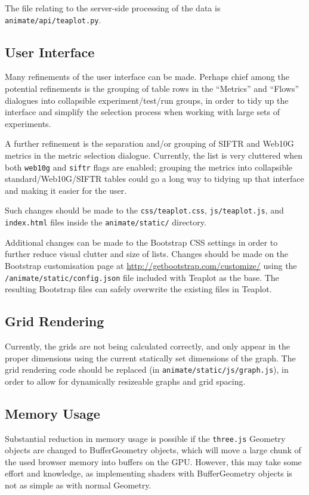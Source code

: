 \documentclass[a4paper,twocolumn,english,11pt, a4paper, conference]{IEEEtran}
\begin{document}
The file relating to the server-side processing of the data is \texttt{animate/api/teaplot.py}.

\subsection{User Interface}
Many refinements of the user interface can be made. Perhaps chief among the potential refinements is the grouping of table rows in the ``Metrics'' and ``Flows'' dialogues into collapsible experiment/test/run groups, in order to tidy up the interface and simplify the selection process when working with large sets of experiments. 

A further refinement is the separation and/or grouping of SIFTR \cite{siftr} and Web10G \cite{web10g} metrics in the metric selection dialogue. Currently, the list is very cluttered when both \texttt{web10g} and \texttt{siftr} flags are enabled; grouping the metrics into collapsible standard/Web10G/SIFTR tables could go a long way to tidying up that interface and making it easier for the user.

Such changes should be made to the \texttt{css/teaplot.css}, \texttt{js/teaplot.js}, and \texttt{index.html} files inside the \texttt{animate/static/} directory.

Additional changes can be made to the Bootstrap CSS settings in order to further reduce visual clutter and size of lists. Changes should be made on the Bootstrap customisation page at \url{http://getbootstrap.com/customize/} using the \texttt{/animate/static/config.json} file included with Teaplot as the base. The resulting Bootstrap files can safely overwrite the existing files in Teaplot.

\subsection{Grid Rendering}

Currently, the grids are not being calculated correctly, and only appear in the proper dimensions using the current statically set dimensions of the graph. The grid rendering code should be replaced (in \texttt{animate/static/js/graph.js}), in order to allow for dynamically resizeable graphs and grid spacing.

\subsection{Memory Usage}
Substantial reduction in memory usage is possible if the \texttt{three.js} Geometry objects are changed to BufferGeometry objects, which will move a large chunk of the used browser memory into buffers on the GPU. However, this may take some effort and knowledge, as implementing shaders with BufferGeometry objects is not as simple as with normal Geometry. 
\end{document}

